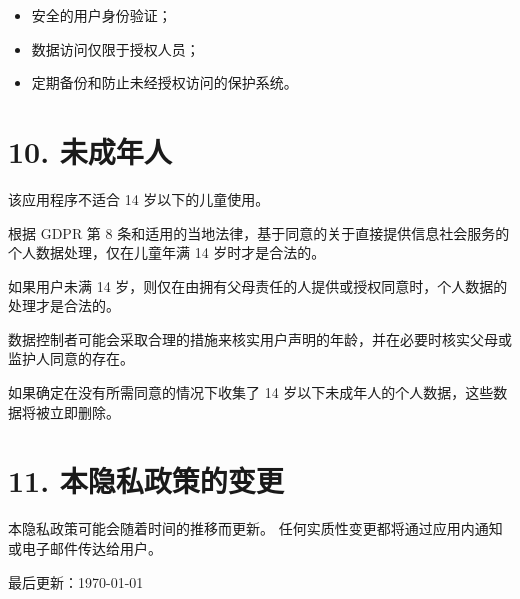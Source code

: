 \documentclass[a4paper,12pt]{article}
\begin{document}
    \begin{itemize}
        \item 安全的用户身份验证；
        \item 数据访问仅限于授权人员；
        \item 定期备份和防止未经授权访问的保护系统。
    \end{itemize}

    \section*{10. 未成年人}

    该应用程序不适合 14 岁以下的儿童使用。

    根据 GDPR 第 8 条和适用的当地法律，基于同意的关于直接提供信息社会服务的个人数据处理，仅在儿童年满 14 岁时才是合法的。

    如果用户未满 14 岁，则仅在由拥有父母责任的人提供或授权同意时，个人数据的处理才是合法的。

    数据控制者可能会采取合理的措施来核实用户声明的年龄，并在必要时核实父母或监护人同意的存在。

    如果确定在没有所需同意的情况下收集了 14 岁以下未成年人的个人数据，这些数据将被立即删除。

    \section*{11. 本隐私政策的变更}

    本隐私政策可能会随着时间的推移而更新。
    任何实质性变更都将通过应用内通知或电子邮件传达给用户。

    \vspace{1cm}

    \noindent
    最后更新：\today
\end{document}

